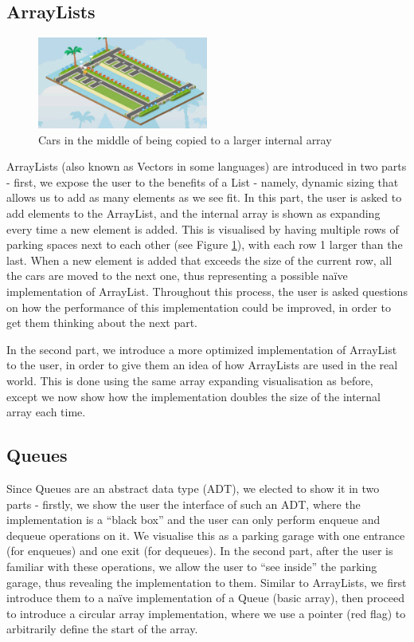 \documentclass[11pt]{article}
\begin{document}
\subsection{ArrayLists}
\begin{figure}
  \centering
  \includegraphics[width=0.5\textwidth]{images/listcopy.png}
\caption{Cars in the middle of being copied to a larger internal array}
\label{fig:listcopy}
\end{figure}
ArrayLists (also known as Vectors in some languages) are introduced in two parts - first, we expose the user to the benefits of a List - namely, dynamic sizing that allows us to add as many elements as we see fit. In this part, the user is asked to add elements to the ArrayList, and the internal array is shown as expanding every time a new element is added. This is visualised by having multiple rows of parking spaces next to each other (see Figure \ref{fig:listcopy}), with each row 1 larger than the last. When a new element is added that exceeds the size of the current row, all the cars are moved to the next one, thus representing a possible naïve implementation of ArrayList. Throughout this process, the user is asked questions on how the performance of this implementation could be improved, in order to get them thinking about the next part.\par
In the second part, we introduce a more optimized implementation of ArrayList to the user, in order to give them an idea of how ArrayLists are used in the real world. This is done using the same array expanding visualisation as before, except we now show how the implementation doubles the size of the internal array each time.
\subsection{Queues}
Since Queues are an abstract data type (ADT), we elected to show it in two parts - firstly, we show the user the interface of such an ADT, where the implementation is a ``black box'' and the user can only perform enqueue and dequeue operations on it. We visualise this as a parking garage with one entrance (for enqueues) and one exit (for dequeues). In the second part, after the user is familiar with these operations, we allow the user to ``see inside'' the parking garage, thus revealing the implementation to them. Similar to ArrayLists, we first introduce them to a naïve implementation of a Queue (basic array), then proceed to introduce a circular array implementation, where we use a pointer (red flag) to arbitrarily define the start of the array.
\end{document}
